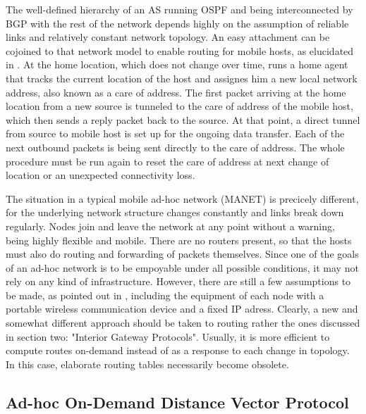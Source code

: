 \documentclass{acm_proc_article-sp}
\begin{document}
The well-defined hierarchy of an AS running OSPF and being interconnected by BGP with the rest of the network depends highly on the assumption of reliable links and relatively constant network topology. An easy attachment can be cojoined to that network model to enable routing for mobile hosts, as elucidated in \cite{tanenbaum}. At the home location, which does not change over time, runs a home agent that tracks the current location of the host and assignes him a new local network address, also known as a care of address. The first packet arriving at the home location from a new source is tunneled to the care of address of the mobile host, which then sends a reply packet back to the source. At that point, a direct tunnel from source to mobile host is set up for the ongoing data transfer. Each of the next outbound packets is being sent directly to the care of address. The whole procedure must be run again to reset the care of address at next change of location or an unexpected connectivity loss.  

The situation in a typical mobile ad-hoc network (MANET) is precicely different, for the underlying network structure changes constantly and links break down regularly. Nodes join and leave the network at any point without a warning, being highly flexible and mobile. There are no routers present, so that the hosts must also do routing and forwarding of packets themselves. Since one of the goals of an ad-hoc network is to be empoyable under all possible conditions, it may not rely on any kind of infrastructure. However, there are still a few assumptions to be made, as pointed out in \cite{haas}, including the equipment of each node with a portable wireless communication device and a fixed IP adress. Clearly, a new and somewhat different approach should be taken to routing rather the ones discussed in section two: "Interior Gateway Protocols". Usually, it is more efficient to compute routes on-demand instead of as a response to each change in topology. In this case, elaborate routing tables necessarily become obsolete.

\subsection{Ad-hoc On-Demand Distance Vector Protocol}
\end{document}
